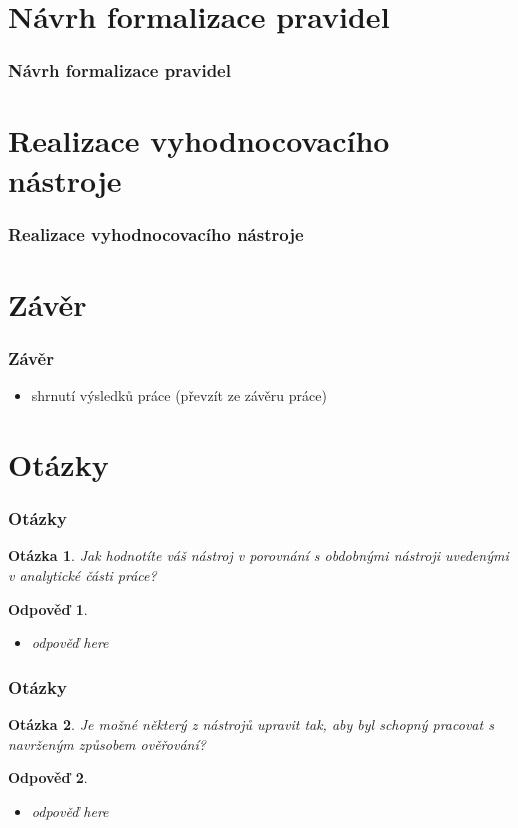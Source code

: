 \documentclass{beamer}
\newtheorem*{question}{Otázka}
\newtheorem*{response}{Odpověď}
\begin{document}
\section{Návrh formalizace pravidel}
\begin{frame}
\frametitle{Návrh formalizace pravidel}
\end{frame}

\section{Realizace vyhodnocovacího nástroje}
\begin{frame}
\frametitle{Realizace vyhodnocovacího nástroje}
\end{frame}

\section{Závěr}
\begin{frame}
\frametitle{Závěr}
\begin{itemize}
\item shrnutí výsledků práce (převzít ze závěru práce)
\end{itemize}
\end{frame}

\section{Otázky}
\begin{frame}
  \frametitle{Otázky}
  \begin{question}
    Jak hodnotíte váš nástroj v porovnání s obdobnými nástroji uvedenými v analytické části práce?
  \end{question}
  \begin{response}
    \begin{itemize}
      \item odpověď here
    \end{itemize}
  \end{response}
\end{frame}

\begin{frame}
  \frametitle{Otázky}
  \begin{question}
    Je možné některý z nástrojů upravit tak, aby byl schopný pracovat s navrženým způsobem ověřování?
  \end{question}
  \begin{response}
    \begin{itemize}
      \item odpověď here
    \end{itemize}
  \end{response}
\end{frame}
\end{document}
